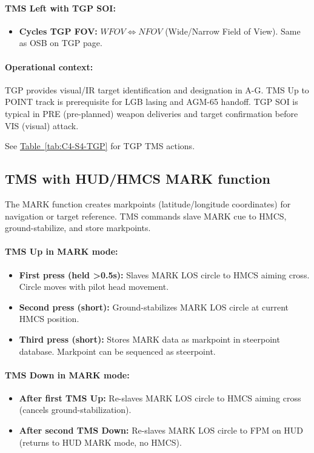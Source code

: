\documentclass[11pt, a4paper, twoside]{report}
\newcommand{\tabref}[1]{\hyperref[#1]{Table~\ref*{#1}}}
\begin{document}
\paragraph{TMS Left with TGP SOI:}
\begin{itemize}
    \item \textbf{Cycles TGP FOV:} $WFOV \iff NFOV$ (Wide/Narrow Field of View). Same as OSB on TGP page.
\end{itemize}

\paragraph{Operational context:}
TGP provides visual/IR target identification and designation in A-G. TMS Up to POINT track is prerequisite for LGB lasing and AGM-65 handoff. TGP SOI is typical in PRE (pre-planned) weapon deliveries and target confirmation before VIS (visual) attack.

See \tabref{tab:C4-S4-TGP} for TGP TMS actions.

\subsection{TMS with HUD/HMCS MARK function}
\label{sec:C4-S4-S3}

The MARK function creates markpoints (latitude/longitude coordinates) for navigation or target reference. TMS commands slave MARK cue to HMCS, ground-stabilize, and store markpoints.

\paragraph{TMS Up in MARK mode:}
\begin{itemize}
    \item \textbf{First press (held >0.5s):} Slaves MARK LOS circle to HMCS aiming cross. Circle moves with pilot head movement.
    \item \textbf{Second press (short):} Ground-stabilizes MARK LOS circle at current HMCS position.
    \item \textbf{Third press (short):} Stores MARK data as markpoint in steerpoint database. Markpoint can be sequenced as steerpoint.
\end{itemize}

\paragraph{TMS Down in MARK mode:}
\begin{itemize}
    \item \textbf{After first TMS Up:} Re-slaves MARK LOS circle to HMCS aiming cross (cancels ground-stabilization).
    \item \textbf{After second TMS Down:} Re-slaves MARK LOS circle to FPM on HUD (returns to HUD MARK mode, no HMCS).
\end{itemize}
\end{document}
